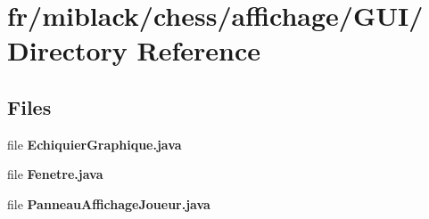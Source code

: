 \section{fr/miblack/chess/affichage/\-G\-U\-I/ Directory Reference}
\label{dir_b5c3c4ade8a5595b0d17e10b28a4497f}
\subsection*{Files}
\begin{DoxyCompactItemize}
\item 
file {\bfseries Echiquier\-Graphique.\-java}
\item 
file {\bfseries Fenetre.\-java}
\item 
file {\bfseries Panneau\-Affichage\-Joueur.\-java}
\end{DoxyCompactItemize}

